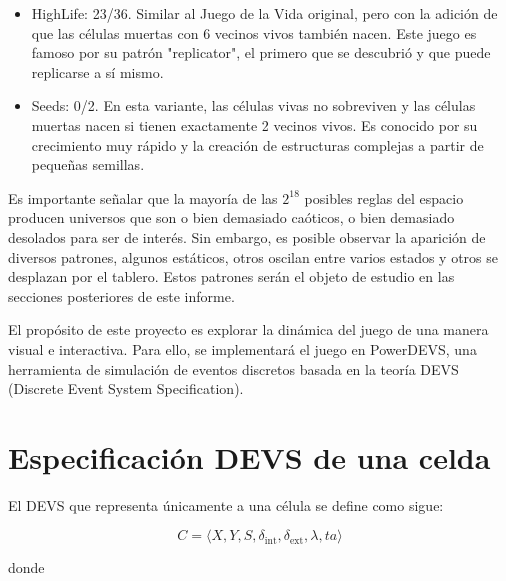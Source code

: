 \documentclass[]{article}
\newcommand{\dint}{\delta_{\text{int}}}
\newcommand{\dext}{\delta_{\text{ext}}}
\begin{document}
\begin{itemize}
  \item HighLife: 23/36. Similar al Juego de la Vida original, pero con la adición de que las células muertas con 6 vecinos vivos también nacen. Este juego es famoso por su patrón "replicator", el primero que se descubrió y que puede replicarse a sí mismo.
  \item Seeds: 0/2. En esta variante, las células vivas no sobreviven y las células muertas nacen si tienen exactamente 2 vecinos vivos. Es conocido por su crecimiento muy rápido y la creación de estructuras complejas a partir de pequeñas semillas.
\end{itemize}

Es importante señalar que la mayoría de las $2^18$ posibles reglas del espacio producen universos que son o bien demasiado caóticos, o bien demasiado desolados para ser de interés. Sin embargo, es posible observar la aparición de diversos patrones, algunos  estáticos, otros oscilan entre varios estados y otros se desplazan por el tablero. Estos patrones serán el objeto de estudio en las secciones posteriores de este informe.

El propósito de este proyecto es explorar la dinámica del juego de una manera visual e interactiva. Para ello, se implementará el juego en PowerDEVS, una herramienta de simulación de eventos discretos basada en la teoría DEVS (Discrete Event System Specification).

\section{Especificación DEVS de una celda}\label{sec:esp}


El DEVS que representa únicamente a una célula se define como sigue:

\[ C = \langle X, Y, S, \dint, \dext, \lambda, ta \rangle \]

donde
\end{document}
